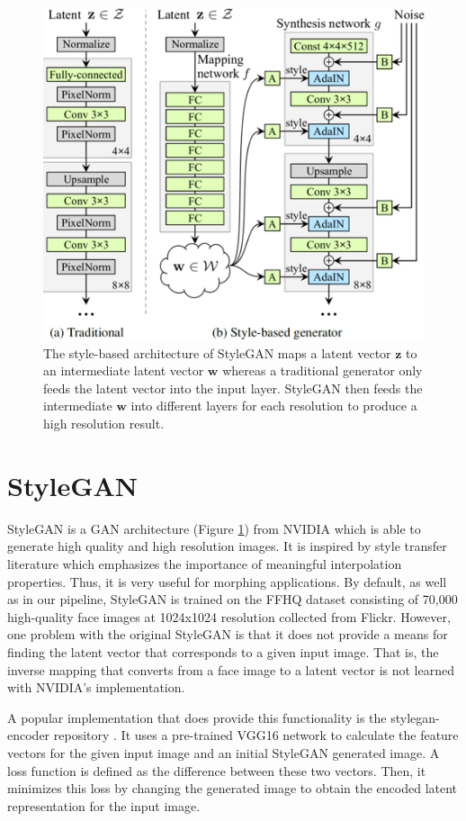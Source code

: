 \documentclass[12pt]{article}
\begin{document}
\begin{figure}
    \centering
    \includegraphics{sgan1_arch.png}
    \caption{The style-based architecture of StyleGAN maps a latent vector $\mathbf{z}$ to an intermediate latent vector $\mathbf{w}$ whereas a traditional generator only feeds the latent vector into the input layer. StyleGAN then feeds the intermediate $\mathbf{w}$ into different layers for each resolution to produce a high resolution result.}
    \label{sgan1_arch}
\end{figure}
\section{StyleGAN}
\par
StyleGAN \cite{stylegan} is a GAN architecture (Figure \ref{sgan1_arch}) from NVIDIA which is able to generate high quality and high resolution images. It is inspired by style transfer literature which emphasizes the importance of meaningful interpolation properties. Thus, it is very useful for morphing applications. By default, as well as in our pipeline, StyleGAN is trained on the FFHQ dataset consisting of 70,000 high-quality face images at 1024x1024 resolution collected from Flickr. However, one problem with the original StyleGAN is that it does not provide a means for finding the latent vector that corresponds to a given input image. That is, the inverse mapping that converts from a face image to a latent vector is not learned with NVIDIA's implementation.

\par
A popular implementation that does provide this functionality is the stylegan-encoder repository \cite{stylegan-encoder}. It uses a pre-trained VGG16 network to calculate the feature vectors for the given input image and an initial StyleGAN generated image. A loss function is defined as the difference between these two vectors. Then, it minimizes this loss by changing the generated image to obtain the encoded latent representation for the input image.
\end{document}
